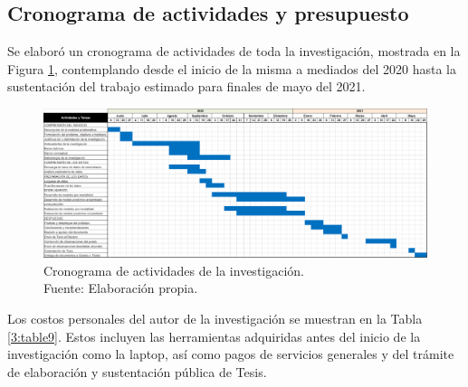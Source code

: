 \begin{landscape}
	\section{Cronograma de actividades y presupuesto}
	Se elaboró un cronograma de actividades de toda la investigación, mostrada en la Figura \ref{3:fig13}, contemplando desde el inicio de la misma a mediados del 2020 hasta la sustentación del trabajo estimado para finales de mayo del 2021.
	
	\begin{figure}[!ht]
		\begin{center}
			\includegraphics[width=1.55\textwidth]{3/figures/cronograma.png}
			\caption[Cronograma de actividades de la investigación]{Cronograma de actividades de la investigación.\\
				Fuente: Elaboración propia.}
			\label{3:fig13}
		\end{center}
	\end{figure}
	
\end{landscape}

Los costos personales del autor de la investigación se muestran en la Tabla \ref{3:table9}. Estos incluyen las herramientas adquiridas antes del inicio de la investigación como la laptop, así como pagos de servicios generales y del trámite de elaboración y sustentación pública de Tesis.

